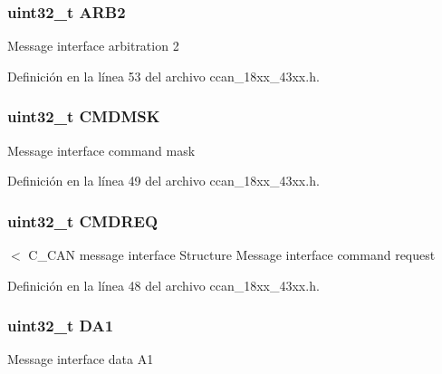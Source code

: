 \subsubsection[{\texorpdfstring{A\+R\+B2}{ARB2}}]{ uint32\+\_\+t A\+R\+B2}\hypertarget{struct_c_c_a_n___i_f___t_ac8bf4742838ab6426e88ef2c97776605}{}\label{struct_c_c_a_n___i_f___t_ac8bf4742838ab6426e88ef2c97776605}
Message interface arbitration 2 

Definición en la línea 53 del archivo ccan\+\_\+18xx\+\_\+43xx.\+h.

\subsubsection[{\texorpdfstring{C\+M\+D\+M\+SK}{CMDMSK}}]{ uint32\+\_\+t C\+M\+D\+M\+SK}\hypertarget{struct_c_c_a_n___i_f___t_a6b639f249c145d50a97b78a8fc31028b}{}\label{struct_c_c_a_n___i_f___t_a6b639f249c145d50a97b78a8fc31028b}
Message interface command mask 

Definición en la línea 49 del archivo ccan\+\_\+18xx\+\_\+43xx.\+h.

\subsubsection[{\texorpdfstring{C\+M\+D\+R\+EQ}{CMDREQ}}]{ uint32\+\_\+t C\+M\+D\+R\+EQ}\hypertarget{struct_c_c_a_n___i_f___t_a76c60555cc759597b05f8d575abfa2f0}{}\label{struct_c_c_a_n___i_f___t_a76c60555cc759597b05f8d575abfa2f0}
$<$ C\+\_\+\+C\+AN message interface Structure Message interface command request 

Definición en la línea 48 del archivo ccan\+\_\+18xx\+\_\+43xx.\+h.

\subsubsection[{\texorpdfstring{D\+A1}{DA1}}]{ uint32\+\_\+t D\+A1}\hypertarget{struct_c_c_a_n___i_f___t_a0f6d287d59f505a494b384fcb846c333}{}\label{struct_c_c_a_n___i_f___t_a0f6d287d59f505a494b384fcb846c333}
Message interface data A1 

